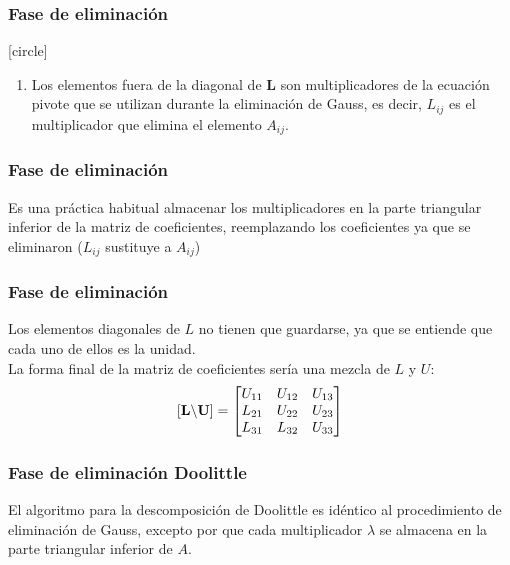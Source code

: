 \begin{frame}
\frametitle{Fase de eliminación}
[circle]
\begin{enumerate}[<+->]
\conti
\item Los elementos fuera de la diagonal de $\mathbf{L}$ son multiplicadores de la ecuación pivote que se utilizan durante la eliminación de Gauss, es decir, $L_{ij}$ es el multiplicador que elimina el elemento $A_{ij}$.
\end{enumerate}
\end{frame}
\begin{frame}
\frametitle{Fase de eliminación}
Es una práctica habitual almacenar los multiplicadores en la parte triangular inferior de la matriz de coeficientes, reemplazando los coeficientes ya que se eliminaron ($L_{ij}$ sustituye a $A_{ij}$)
\end{frame}
\begin{frame}
\frametitle{Fase de eliminación}
Los elementos diagonales de $L$ no tienen que guardarse, ya que se entiende que cada uno de ellos es la unidad.
\\
\bigskip
La forma final de la matriz de coeficientes sería una mezcla de $L$ y $U$:
\begin{align*}
\qty[ \mathbf{L \backslash U} ] =
\begin{bmatrix}
U_{11} & U_{12} & U_{13} \\
L_{21} & U_{22} & U_{23} \\
L_{31} & L_{32} & U_{33}
\end{bmatrix}
\end{align*}
\end{frame}
\begin{frame}[fragile]
\frametitle{Fase de eliminación Doolittle}
El algoritmo para la descomposición de Doolittle es idéntico al procedimiento de eliminación de Gauss, excepto por que cada multiplicador $\lambda$ se almacena en la parte triangular inferior de $A$.
\end{frame}
